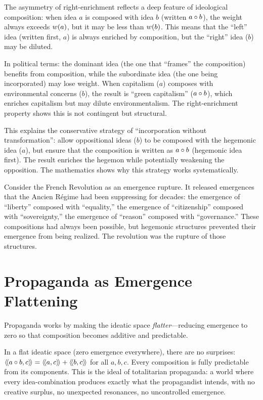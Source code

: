 \begin{interpretation}
The asymmetry of right-enrichment reflects a deep feature of ideological
composition: when idea $a$ is composed with idea $b$ (written $a \circ b$),
the weight always exceeds $w(a)$, but it may be less than $w(b)$.
This means that the ``left'' idea (written first, $a$) is always enriched by
composition, but the ``right'' idea ($b$) may be diluted.

In political terms: the dominant idea (the one that ``frames'' the composition)
benefits from composition, while the subordinate idea (the one being incorporated)
may lose weight. When capitalism ($a$) composes with environmental concerns ($b$),
the result is ``green capitalism'' ($a \circ b$), which enriches capitalism
but may dilute environmentalism. The right-enrichment property shows this is
not contingent but structural.

This explains the conservative strategy of ``incorporation without transformation'':
allow oppositional ideas ($b$) to be composed with the hegemonic idea ($a$),
but ensure that the composition is written as $a \circ b$ (hegemonic idea
first). The result enriches the hegemon while potentially weakening the opposition.
The mathematics shows why this strategy works systematically.
\end{interpretation}

\begin{remark}
Consider the French Revolution as an emergence rupture. It released
emergences that the Ancien R\'egime had been suppressing for decades: the
emergence of ``liberty'' composed with ``equality,'' the emergence of
``citizenship'' composed with ``sovereignty,'' the emergence of ``reason''
composed with ``governance.'' These compositions had always been possible, but
hegemonic structures prevented their emergence from being realized. The
revolution was the rupture of those structures.
\end{remark}


\section{Propaganda as Emergence Flattening}

Propaganda works by making the ideatic space \emph{flatter}---reducing emergence
to zero so that composition becomes additive and predictable.

In a flat ideatic space (zero emergence everywhere), there are no surprises:
$\langle\!\langle a \circ b, c \rangle\!\rangle = \langle\!\langle a, c \rangle\!\rangle + \langle\!\langle b, c \rangle\!\rangle$ for all $a, b, c$. Every
composition is fully predictable from its components. This is the ideal of
totalitarian propaganda: a world where every idea-combination produces exactly
what the propagandist intends, with no creative surplus, no unexpected resonances,
no uncontrolled emergence.

